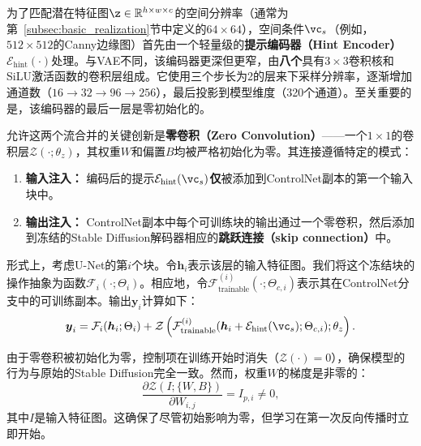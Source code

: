 \documentclass[../../book-main_zh.tex]{subfiles}
\begin{document}
为了匹配潜在特征图$\z \in \mathbb{R}^{h \times w \times c}$的空间分辨率（通常为第~\ref{subsec:basic_realization}节中定义的$64 \times 64$），空间条件$\vc_s$（例如，$512 \times 512$的Canny边缘图）首先由一个轻量级的\textbf{提示编码器（Hint Encoder）}$\mathcal{E}_{\text{hint}}(\cdot)$处理。与VAE不同，该编码器更深但更窄，由\textbf{八个}具有$3 \times 3$卷积核和SiLU激活函数的卷积层组成。它使用三个步长为2的层来下采样分辨率，逐渐增加通道数（$16 \to 32 \to 96 \to 256$），最后投影到模型维度（320个通道）。至关重要的是，该编码器的最后一层是零初始化的。

允许这两个流合并的关键创新是\textbf{零卷积（Zero Convolution）}——一个$1 \times 1$的卷积层$\mathcal{Z}(\cdot; \theta_z)$，其权重$W$和偏置$B$均被严格初始化为零。其连接遵循特定的模式：
\begin{enumerate}
    \item \textbf{输入注入：} 编码后的提示$\mathcal{E}_{\text{hint}}(\vc_s)$\textbf{仅}被添加到ControlNet副本的第一个输入块中。
    \item \textbf{输出注入：} ControlNet副本中每个可训练块的输出通过一个零卷积，然后添加到冻结的Stable Diffusion解码器相应的\textbf{跳跃连接（skip connection）}中。
\end{enumerate}



形式上，考虑U-Net的第$i$个块。令$\boldsymbol{h}_i$表示该层的输入特征图。我们将这个冻结块的操作抽象为函数$\mathcal{F}_i(\cdot; \Theta_i)$。相应地，令$\mathcal{F}_{\text{trainable}}^{(i)}(\cdot; \Theta_{c,i})$表示其在ControlNet分支中的可训练副本。输出$\boldsymbol{y}_i$计算如下：
\begin{equation}
    \boldsymbol{y}_i = \mathcal{F}_i(\boldsymbol{h}_i; \Theta_i) + \mathcal{Z}\left( \mathcal{F}_{\text{trainable}}^{(i)}(\boldsymbol{h}_i + \mathcal{E}_{\text{hint}}(\vc_s); \Theta_{c,i}); \theta_z \right).
    \label{eq:controlnet}
\end{equation}





由于零卷积被初始化为零，控制项在训练开始时消失（$\mathcal{Z}(\cdot) = 0$），确保模型的行为与原始的Stable Diffusion完全一致。然而，权重$W$的梯度是非零的：
\begin{equation}
    \frac{\partial \mathcal{Z}(I; \{W, B\})}{\partial W_{i,j}} = I_{p,i} \neq 0,
\end{equation}
其中$I$是输入特征图。这确保了尽管初始影响为零，但学习在第一次反向传播时立即开始。
\end{document}
